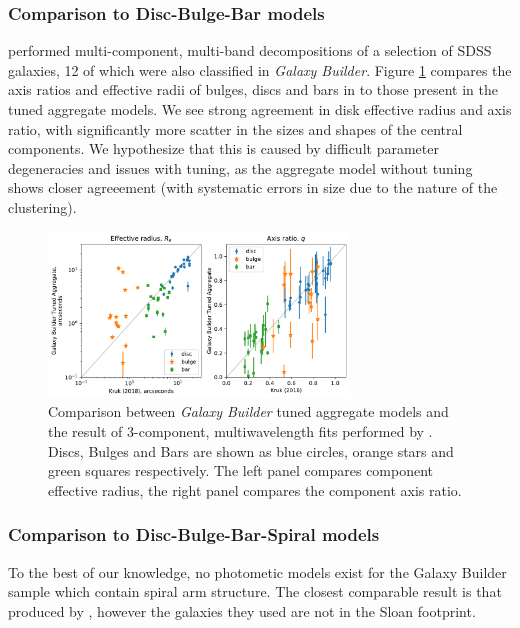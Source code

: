 \documentclass[../main.tex]{subfiles}
\begin{document}
\subsubsection{Comparison to Disc-Bulge-Bar models}

\citet{2018MNRAS.473.4731K} performed multi-component, multi-band decompositions of a selection of SDSS galaxies, 12 of which were also classified in \textit{Galaxy Builder}. Figure \ref{fig:sd_comp_comparison} compares the axis ratios and effective radii of bulges, discs and bars in \citet{2018MNRAS.473.4731K} to those present in the tuned aggregate models. We see strong agreement in disk effective radius and axis ratio, with significantly more scatter in the sizes and shapes of the central components. We hypothesize that this is caused by difficult parameter degeneracies and issues with tuning, as the aggregate model without tuning shows closer agreeement (with systematic errors in size due to the nature of the clustering).

\begin{figure}
  \includegraphics[width=8cm]{images__results/sd_comp_comparison.pdf}
  \caption{Comparison between \textit{Galaxy Builder} tuned aggregate models and the result of 3-component, multi\-wavelength fits performed by \citet{2018MNRAS.473.4731K}. Discs, Bulges and Bars are shown as blue circles, orange stars and green squares respectively. The left panel compares component effective radius, the right panel compares the component axis ratio.}
  \label{fig:sd_comp_comparison}
\end{figure}


\subsubsection{Comparison to Disc-Bulge-Bar-Spiral models}
To the best of our knowledge, no photometic models exist for the Galaxy Builder sample which contain spiral arm structure. The closest comparable result is that produced by \citet{Gao2017:1709.00746v1}, however the galaxies they used are not in the Sloan footprint.
\end{document}
